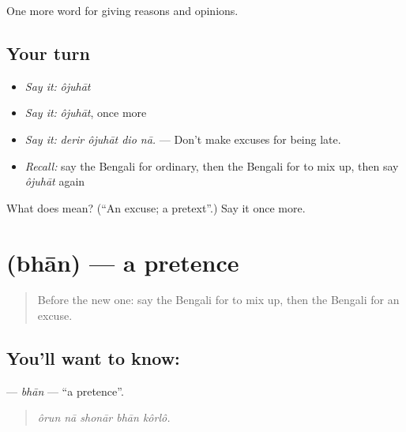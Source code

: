 \begin{grammarlens}[title={What you've built}]
One more word for giving reasons and opinions.
\end{grammarlens}

\subsection*{Your turn}
\begin{itemize}
\raggedright
  \item \emph{Say it:} \emph{ôjuhāt}
  \item \emph{Say it:} \emph{ôjuhāt}, once more
  \item \emph{Say it:} \emph{derir ôjuhāt dio nā.} — Don't make excuses for being late.
  \item \emph{Recall:} say the Bengali for ordinary, then the Bengali for to mix up, then say \emph{ôjuhāt} again
\end{itemize}

\begin{tcolorbox}[breakable,colback=teal!4,colframe=teal!35!black,title={Before you move on}]
What does  mean? (\textquotedblleft{}An excuse; a pretext\textquotedblright{}.) Say it once more.
\end{tcolorbox}
\section[\texorpdfstring{\bn{ভান} (bhān)}{ভান (bhān)}]{ (bhān) — a pretence}

\label{lesson:BN-C359-bhan}



\begin{quote}
Before the new one: say the Bengali for to mix up, then the Bengali for an excuse.
\end{quote}

\subsection*{You'll want to know: }
\textbf{} — \emph{bhān} — \textquotedblleft{}a pretence\textquotedblright{}.

\begin{quote}
    
\end{quote}

\begin{quote}
\emph{ôrun nā shonār bhān kôrlô.}
\end{quote}


